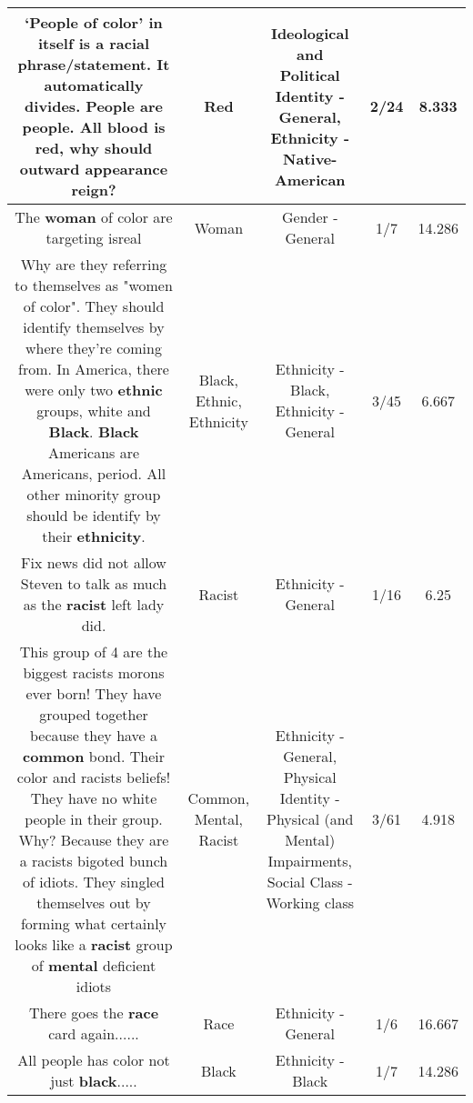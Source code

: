 \documentclass[11pt]{article}
\newlength\mylength
\begin{document}
\begin{center}
\begin{longtable}{|C{.65\mylength}|C{.30\mylength}|C{.12\mylength}|C{.12\mylength}|C{.12\mylength}|}
  \small ‘People of color' in itself is a racial phrase/statement. It automatically divides. People are people. All blood is \textbf{r\textbf{ed}}, why should outward appearance reign?\normalsize   & Red &  Ideological and Political Identity - General, Ethnicity - Native-American & 2/24 & 8.333 \\  \hline
  \small The \textbf{woman} of color are targeting isreal\normalsize   & Woman & Gender - General & 1/7 & 14.286 \\  \hline
  \small Why are they referring to themselves as "women of color".  They should identify themselves by where they're coming from.  In America, there were only two \textbf{ethnic} groups, white and \textbf{Black}.  \textbf{Black} Americans are Americans, period.  All other minority group should be identify by their \textbf{ethnicity}.\normalsize   & Black, Ethnic, Ethnicity & Ethnicity - Black, Ethnicity - General & 3/45 & 6.667 \\  \hline
  \small Fix news did not allow Steven to talk as much as the \textbf{racist} left lady did.\normalsize   & Racist & Ethnicity - General & 1/16 & 6.25 \\  \hline
  \small This group of 4 are the biggest racists morons ever born! They have grouped together because they have a \textbf{common} bond. Their color and racists beliefs! They have no white people in their group. Why? Because they are a racists bigoted bunch of idiots. They singled themselves out by forming what certainly looks like a \textbf{racist} group of \textbf{mental} deficient idiots\normalsize   & Common, Mental, Racist & Ethnicity - General, Physical Identity - Physical (and Mental) Impairments, Social Class - Working class & 3/61 & 4.918 \\  \hline
  \small There goes the \textbf{race} card again......\normalsize   & Race & Ethnicity - General & 1/6 & 16.667 \\  \hline
  \small All people has color not just \textbf{black}.....\normalsize   & Black & Ethnicity - Black & 1/7 & 14.286 \\  \hline

\end{longtable}
\end{center}
\end{document}
